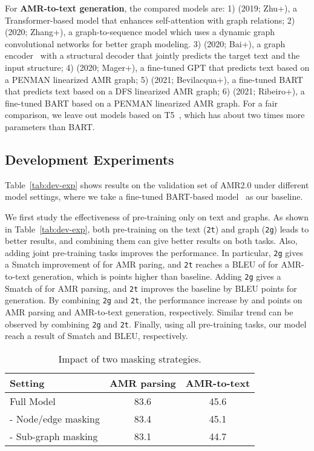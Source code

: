 \documentclass[11pt]{article}
\begin{document}
For \textbf{AMR-to-text generation}, the compared models are: 
1) \citeauthor{zhu2019modeling} (2019; Zhu+), a Transformer-based model that enhances self-attention with graph relations; 
2) \citeauthor{zhang2020lightweight} (2020; Zhang+), a graph-to-sequence model which uses a dynamic graph convolutional networks for better graph modeling.
3) \citeauthor{bai-etal-2020-online} (2020; Bai+), a graph encoder~\cite{zhu2019modeling} with a structural decoder that jointly predicts the target text and the input structure;
4) \citeauthor{mager-etal-2020-gpt} (2020; Mager+), a fine-tuned GPT that predicts text based on a PENMAN linearized AMR graph;
5) \citeauthor{Bevilacqua_Blloshmi_Navigli_2021} (2021; Bevilacqua+), a fine-tuned BART that predicts text based on a DFS linearized AMR graph;
6) \citeauthor{ribeiro-etal-2021-investigating} (2021; Ribeiro+), a fine-tuned BART based on a PENMAN linearized AMR graph.
For a fair comparison, we leave out models based on T5~\cite{ribeiro-etal-2021-investigating,Ribeiro2021StructuralAI}, which has about two times more parameters than BART.


\subsection{Development Experiments}
\label{sec:dev-exp}
Table~\ref{tab:dev-exp} shows results on the validation set of AMR2.0 under different model settings, where we take a fine-tuned BART-based model~\cite{Bevilacqua_Blloshmi_Navigli_2021} as our baseline.

We first study the effectiveness of pre-training only on text and graphs.
As shown in Table~\ref{tab:dev-exp}, both pre-training on the text (\texttt{2t}) and graph (\texttt{2g}) leads to better results, and combining them can give better results on both tasks.
Also, adding joint pre-training tasks improves the performance. 
In particular, \texttt{2g} gives a Smatch improvement of  for AMR paring, and \texttt{2t} reaches a BLEU of  for AMR-to-text generation, which is  points higher than baseline. 
Adding \texttt{2g} gives a Smatch of  for AMR parsing, and \texttt{2t} improves the baseline by  BLEU points for generation.
By combining \texttt{2g} and \texttt{2t}, the performance increase by  and  points on AMR parsing and AMR-to-text generation, respectively.
Similar trend can be observed by combining \texttt{2g} and \texttt{2t}.
Finally, using all  pre-training tasks, our model reach a result of  Smatch and  BLEU, respectively.

\begin{table}
	\centering
	\small
	\begin{tabular}{lcc}
		\toprule
        \textbf{Setting} & AMR parsing & AMR-to-text \\
		\midrule 	
		Full Model & 83.6 & 45.6  \\
		\quad - Node/edge masking & 83.4 & 45.1 \\
		\quad - Sub-graph masking & 83.1 & 44.7 \\
	\bottomrule
	\end{tabular}
	\caption{Impact of two masking strategies.}
	\label{tab:ablation}
\end{table}
\end{document}
